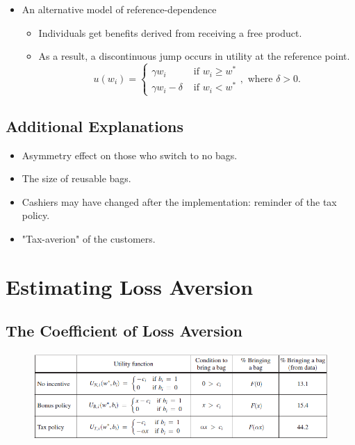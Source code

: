 \documentclass[../root]{subfiles}
\begin{document}
    \begin{itemize}
      \item An alternative model of reference-dependence
      \begin{itemize}
        \item Individuals get benefits derived from receiving a free product.
        \item As a result, a discontinuous jump occurs in utility at the reference point.
        \[
        u(w_i) = \begin{cases}
          \gamma w_i & \text{ if } w_i \geq w^* \\
          \gamma w_i - \delta & \text{ if } w_{i} < w^*
      \end{cases}, \text{ where } \delta > 0.
        \]
      \end{itemize}
    \end{itemize}

    \subsection{Additional Explanations}

    \begin{itemize}
      \item Asymmetry effect on those who switch to no bags.
      \item The size of reusable bags.
      \item Cashiers may have changed after the implementation: reminder of the tax policy.
      \item "Tax-averion" of the customers.
    \end{itemize}

    \section{Estimating Loss Aversion}

    \subsection{The Coefficient of Loss Aversion}

    \begin{figure}[ht]
      \centering
      \includegraphics[scale = 1]{0807tanji/model_esti}
    \end{figure}
\end{document}

